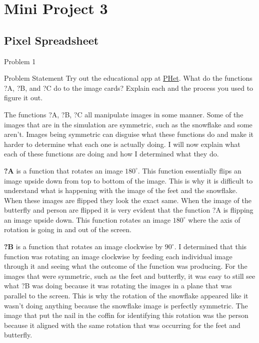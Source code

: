 \clearpage
\chapter{Mini Project 3}

\section{Pixel Spreadsheet}

\begin{problem}{Problem 1}
    \begin{statement}{Problem Statement}
        Try out the educational app at \href{https://phet.colorado.edu/sims/html/function-builder-basics/latest/function-builder-basics_en.html}{PHet}. What do the functions ?A, ?B, and ?C do to the image cards? Explain each and the process you used to figure it out.
    \end{statement}

    \begin{highlight}[Solution]
        The functions ?A, ?B, ?C all manipulate images in some manner. Some of the images that are in the simulation are symmetric, such as the snowflake and some aren't. Images being symmetric can 
        disguise what these functions do and make it harder to determine what each one is actually doing. I will now explain what each of these functions are doing and how I determined what they do.

        \textbf{?A} is a function that rotates an image $180^{\circ}$. This function essentially flips an image upside down from top to bottom of the image. This is why it is difficult to understand 
        what is happening with the image of the feet and the snowflake. When these images are flipped they look the exact same. When the image of the butterfly and person are flipped it is very evident 
        that the function ?A is flipping an image upside down. This function rotates an image $180^{\circ}$ where the axis of rotation is going in and out of the screen.

        \textbf{?B} is a function that rotates an image clockwise by $90^{\circ}$. I determined that this function was rotating an image clockwise by feeding each individual image through it and seeing 
        what the outcome of the function was producing. For the images that were symmetric, such as the feet and butterfly, it was easy to still see what ?B was doing because it was rotating the images 
        in a plane that was parallel to the screen. This is why the rotation of the snowflake appeared like it wasn't doing anything because the snowflake image is perfectly symmetric. The image that 
        put the nail in the coffin for identifying this rotation was the person because it aligned with the same rotation that was occurring for the feet and butterfly.


\end{highlight}
\end{problem}
